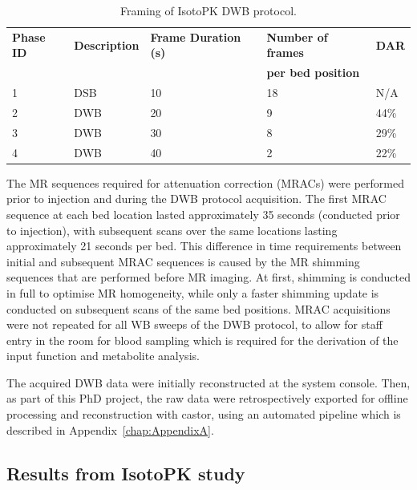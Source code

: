 \begin{table}[ht!]
\centering
\caption{Framing of IsotoPK DWB protocol.}
\label{tab:IsotoPK_Framing}
\begin{tabular}{|l|l|l|l|l|}
\toprule
\textbf{Phase ID} & \textbf{Description}              & \textbf{Frame Duration (s)} & \textbf{Number of frames} & \textbf{DAR} \\
\textbf{} & \textbf{} & \textbf{} & \textbf{per bed position} & \textbf{} \\
\midrule
1        & DSB & 10                 & 18        & N/A                 \\
2        & DWB                      & 20                 & 9         & 44\%                \\
3        & DWB                      & 30                 & 8         & 29\%                \\
4        & DWB                      & 40                 & 2         & 22\%                \\
\bottomrule
\end{tabular}
\end{table}

The MR sequences required for attenuation correction (MRACs) were performed prior to injection and during the DWB protocol acquisition. The first MRAC sequence at each bed location lasted approximately 35 seconds (conducted prior to injection), with subsequent scans over the same locations lasting approximately 21 seconds per bed. This difference in time requirements between initial and subsequent MRAC sequences is caused by the MR shimming sequences that are performed before MR imaging. At first, shimming is conducted in full to optimise MR homogeneity, while only a faster shimming update is conducted on subsequent scans of the same bed positions.
MRAC acquisitions were not repeated for all WB sweeps of the DWB protocol, to allow for staff entry in the room for blood sampling which is required for the derivation of the input function and metabolite analysis. 

The acquired DWB data were initially reconstructed at the system console.
Then, as part of this PhD project, the raw data were retrospectively exported for offline processing and reconstruction with \gls{castor}, using an automated pipeline which is described in Appendix~\ref{chap:AppendixA}.

\subsection{Results from IsotoPK study}

